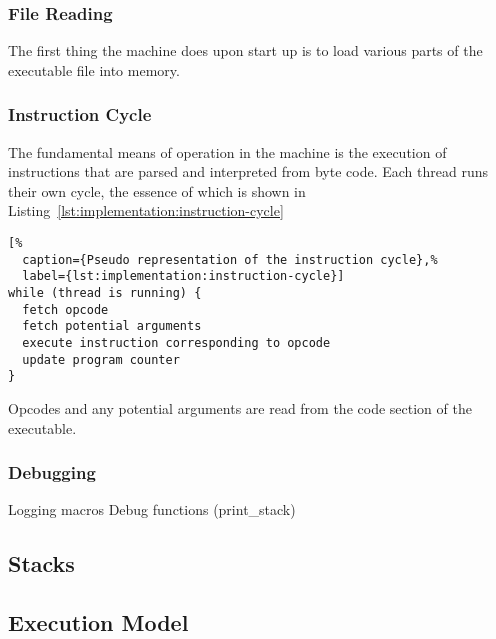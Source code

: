 
\subsubsection{File Reading}
The first thing the machine does upon start up is to load various parts of the
executable file into memory. %

\subsubsection{Instruction Cycle}

The fundamental means of operation in the machine is the execution of
instructions that are parsed and interpreted from byte code. Each thread runs
their own cycle, the essence of which is shown in
Listing~\ref{lst:implementation:instruction-cycle}

\begin{lstlisting}[%
  caption={Pseudo representation of the instruction cycle},%
  label={lst:implementation:instruction-cycle}]
while (thread is running) {
  fetch opcode
  fetch potential arguments
  execute instruction corresponding to opcode
  update program counter
}
\end{lstlisting}

Opcodes and any potential arguments are read from the code section of the
executable.

\subsubsection{Debugging}
Logging macros
Debug functions (print\_stack)



\subsection{Stacks}
\label{sec:implementation:stacks}


\subsection{Execution Model}
% 

